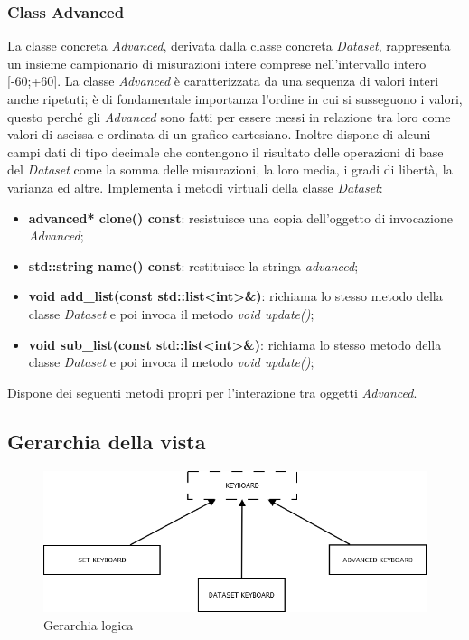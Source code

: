 \documentclass[a4paper,10pt]{article}
\begin{document}
    \subsubsection{Class Advanced}
    La classe concreta \textit{Advanced}, derivata dalla classe concreta \textit{Dataset}, rappresenta un insieme campionario di misurazioni intere comprese nell’intervallo intero [-60;+60]. La classe \textit{Advanced} è caratterizzata da una sequenza di valori interi anche ripetuti; è di fondamentale importanza l’ordine in cui si susseguono i valori, questo perché gli \textit{Advanced} sono fatti per essere messi in relazione tra loro come valori di ascissa e ordinata di un grafico cartesiano. Inoltre dispone di alcuni campi dati di tipo decimale che contengono il risultato delle operazioni di base del \textit{Dataset} come la somma delle misurazioni, la loro media, i gradi di libertà, la varianza ed altre.
    Implementa i metodi virtuali della classe \textit{Dataset}:
	\begin{itemize}
        \item \textbf{advanced* clone() const}: resistuisce una copia dell'oggetto di invocazione \textit{Advanced};
		\item \textbf{std::string name() const}: restituisce la stringa \textit{advanced};
		\item \textbf{void add\_list(const std::list<int>\&)}: richiama lo stesso metodo della classe \textit{Dataset} e poi invoca il metodo \textit{void update()};
        \item \textbf{void sub\_list(const std::list<int>\&)}: richiama lo stesso metodo della classe \textit{Dataset} e poi invoca il metodo \textit{void update()};
    \end{itemize}
    Dispone dei seguenti metodi propri per l'interazione tra oggetti \textit{Advanced}.

    \subsection{Gerarchia della vista}
    \begin{figure}[!h]
		\begin{center} \includegraphics[scale=0.5]{img/Diagramma2.png}
			\caption{Gerarchia logica}
		\end{center}
	\end{figure}
\end{document}
